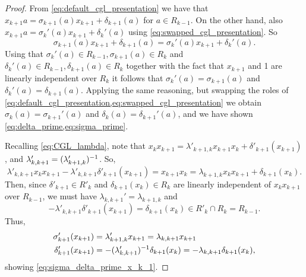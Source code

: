 \documentclass{article}
\begin{document}
\begin{proof}
	From \cref{eq:default_cgl_presentation} we have that $x_{k+1}a = \sigma_{k+1}(a)x_{k+1}
		+ \delta_{k+1}(a)$ for $a \in R_{k-1}$. On the other hand, also $x_{k+1}a =
		\sigma_k'(a)x_{k+1} + \delta_k'(a)$ using \cref{eq:swapped_cgl_presentation}. So
	\begin{equation*}
		\sigma_{k+1}(a)x_{k+1} + \delta_{k+1}(a) = \sigma_k'(a) x_{k+1} + \delta_k'(a).
	\end{equation*}
	Using that $\sigma_k'(a)\in R_{k-1}, \sigma_{k+1}(a) \in R_k$ and $\delta_k'(a) \in
		R_{k-1}, \delta_{k+1}(a) \in R_{k}$ together with the fact that $x_{k+1}$ and 1 are
	linearly independent over $R_k$ it follows that $\sigma_k'(a) = \sigma_{k+1}(a)$ and
	$\delta_k'(a) = \delta_{k+1}(a)$. Applying the same reasoning, but swapping the roles
	of \cref{eq:default_cgl_presentation,eq:swapped_cgl_presentation} we obtain
	$\sigma_k(a) = \sigma_{k+1}'(a)$ and $\delta_k(a) = \delta_{k+1}'(a)$, and we have
	shown \cref{eq:delta_prime,eq:sigma_prime}.

	Recalling \cref{eq:CGL_lambda}, note that $x_k x_{k+1} = \lambda'_{k+1,k}x_{k+1}x_{k} +
		\delta'_{k+1}(x_{k+1})$, and $\lambda'_{k,k+1} = (\lambda_{k+1, k}')^{-1}$. So,
	\begin{equation*}
		\lambda'_{k,k+1}x_k x_{k+1} - \lambda'_{k,k+1} \delta'_{k+1}(x_{k+1}) = x_{k+1} x_k = \lambda_{k+1, k} x_k x_{k+1} + \delta_{k+1}(x_k).
	\end{equation*}
	Then, since $\delta'_{k+1} \in R'_k $ and $\delta_{k+1}(x_k) \in R_k$ are linearly
	independent of $x_k x_{k+1}$ over $R_{k-1}$, we must have $\lambda_{k,k+1}' =
		\lambda_{k+1,k}$ and
	\begin{equation*}
		-\lambda'_{k,k+1}\delta'_{k+1}(x_{k+1}) = \delta_{k+1}(x_k) \in R'_k \cap R_k = R_{k-1}.
	\end{equation*}
	Thus,
	\begin{align*}
		\sigma'_{k+1}(x_{k+1}) & = \lambda'_{k+1,k}x_{k+1} = \lambda_{k, k+1}x_{k+1}         \\
		\delta'_{k+1}(x_{k+1}) & = -(\lambda_{k,k+1}')^{-1} \delta_{k+1}(x_k) = - \lambda_{k,
			k+1}\delta_{k+1}(x_k),
	\end{align*}
	showing \cref{eq:sigma_delta_prime_x_k_1}.
\end{proof}

\end{document}
